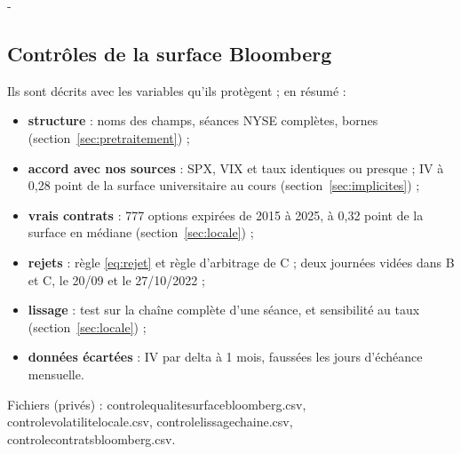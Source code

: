 \documentclass[10pt,a4paper]{article}
\makeatletter
\newcommand{\besoin}[1]{\par\penalty-100\begingroup\setlength{\dimen@}{#1}%
  \dimen@ii\pagegoal\advance\dimen@ii-\pagetotal
  \ifdim\dimen@>\dimen@ii\ifdim\dimen@ii>\z@\vfil\fi\break\fi\endgroup}
\let\soussectionorigine\subsection
\renewcommand{\subsection}{\besoin{5\baselineskip}\soussectionorigine}
\newcommand{\coupure}{\textunderscore\allowbreak}
\newcommand{\fic}[1]{{\small\ttfamily\let\_\coupure #1}}
\makeatother
\begin{document}
\subsection{Contrôles de la surface Bloomberg}
Ils sont décrits avec les variables qu'ils protègent ; en résumé :
\begin{itemize}[nosep,leftmargin=*]
  \item \textbf{structure} : noms des champs, séances NYSE complètes, bornes (section~\ref{sec:pretraitement}) ;
  \item \textbf{accord avec nos sources} : SPX, VIX et taux identiques ou presque ; IV à 0,28 point de la surface universitaire au cours (section~\ref{sec:implicites}) ;
  \item \textbf{vrais contrats} : 777 options expirées de 2015 à 2025, à 0,32 point de la surface en médiane (section~\ref{sec:locale}) ;
  \item \textbf{rejets} : règle \eqref{eq:rejet} et règle d'arbitrage de C ; deux journées vidées dans B et C, le 20/09 et le 27/10/2022 ;
  \item \textbf{lissage} : test sur la chaîne complète d'une séance, et sensibilité au taux (section~\ref{sec:locale}) ;
  \item \textbf{données écartées} : IV par delta à 1 mois, faussées les jours d'échéance mensuelle.
\end{itemize}
Fichiers (privés) : \fic{controle\_qualite\_surface\_bloomberg.csv}, \fic{controle\_volatilite\_locale.csv}, \fic{controle\_lissage\_chaine.csv}, \fic{controle\_contrats\_bloomberg.csv}.
\end{document}
